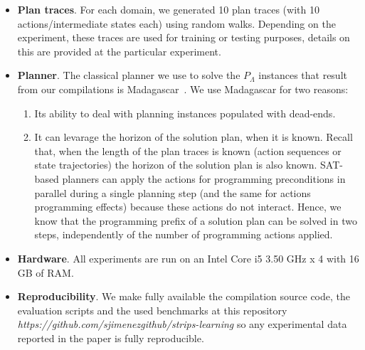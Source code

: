 \begin{itemize}

\item {\bf Plan traces}. For each domain, we generated 10 plan traces (with 10 actions/intermediate states each) using random walks. Depending on the experiment, these traces are used for training or testing purposes, details on this are provided at the particular experiment.

\item {\bf Planner}. The classical planner we use to solve the $P_\Lambda$ instances that result from our compilations is {\sc Madagascar}~\cite{rintanen2014madagascar}. We use {\sc Madagascar} for two reasons:
  \begin{enumerate}
  \item  Its ability to deal with planning instances populated with dead-ends.
  \item  It can levarage the horizon of the solution plan, when it is known. Recall that, when the length of the plan traces is known (\FO action sequences or \FO state trajectories) the horizon of the solution plan is also known. SAT-based planners can apply the actions for programming preconditions in parallel during a single planning step (and the same for actions programming effects) because these actions do not interact. Hence, we know that the programming prefix of a solution plan can be solved in two steps, independently of the number of programming actions applied.
  \end{enumerate}

\item {\bf Hardware}. All experiments are run on an Intel Core i5 3.50 GHz x 4 with 16 GB of RAM.

\item {\bf Reproducibility}. We make fully available the compilation source code, the evaluation scripts and the used benchmarks at this repository {\em https://github.com/sjimenezgithub/strips-learning} so any experimental data reported in the paper is fully reproducible.
\end{itemize}

